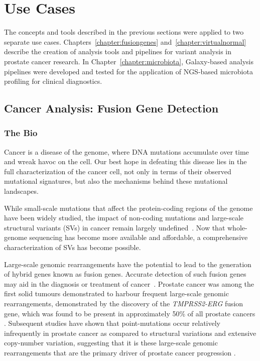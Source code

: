 \section{Use Cases}

The concepts and tools described in the previous sections were applied to two separate use cases. Chapters~\ref{chapter:fusiongenes} and~\ref{chapter:virtualnormal} describe the creation of analysis tools and pipelines for variant analysis in prostate cancer research. In Chapter~\ref{chapter:microbiota}, Galaxy-based analysis pipelines were developed and tested for the application of NGS-based microbiota profiling for clinical diagnostics.


\subsection{Cancer Analysis: Fusion Gene Detection}
\subsubsection{The Bio}

Cancer is a disease of the genome, where DNA mutations accumulate over time and wreak havoc on the cell. Our best hope in defeating this disease lies in the full characterization of the cancer cell, not only in terms of their observed mutational signatures, but also the mechanisms behind these mutational landscapes.

While small-scale mutations that affect the protein-coding regions of the genome have been widely studied, the impact of non-coding mutations and large-scale structural variants (SVs) in cancer remain largely undefined~\cite{cuykendall2017non,khurana2016role}. Now that whole-genome sequencing has become more available and affordable, a comprehensive characterization of SVs has become possible.

Large-scale genomic rearrangements have the potential to lead to the generation of hybrid genes known as fusion genes.
Accurate detection of such fusion genes may aid in the diagnosis or treatment of cancer~\cite{nowell1960chromosome,nowell1961chromosome,druker2001activity,druker2001efficacy}.
Prostate cancer was among the first solid tumours demonstrated to harbour frequent large-scale genomic rearrangements, demonstrated by the discovery of the \emph{TMPRSS2-ERG} fusion gene, which was found to be present in approximately 50\% of all prostate cancers \cite{tomlins2005recurrent}. Subsequent studies have shown that point-mutations occur relatively infrequently in prostate cancer as compared to structural variations and extensive copy-number variation, suggesting that it is these large-scale genomic rearrangements that are the primary driver of prostate cancer progression \cite{taylor2010integrative,rubin2011common}.

